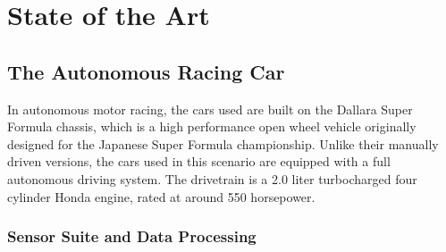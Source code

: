 \documentclass[a4paper,final,12pt]{report}
\begin{document}
\chapter{State of the Art}

\section{The Autonomous Racing Car \cite{motor1}}
In autonomous motor racing, the cars used are built on the Dallara Super Formula chassis, which is a high performance open wheel vehicle originally designed for the Japanese Super Formula championship. Unlike their manually driven versions, the cars used in this scenario are equipped with a full autonomous driving system. The drivetrain is a 2.0 liter turbocharged four cylinder Honda engine, rated at around 550 horsepower.

\subsection{Sensor Suite and Data Processing}
\end{document}
